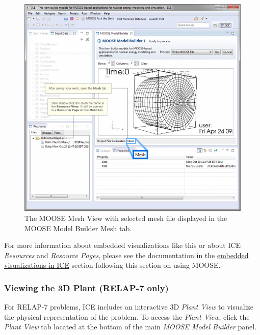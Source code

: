\begin{figure}[htbp]
\centering
\includegraphics[width=\textwidth]{figures/ICE_MOOSE_Mesh-View-2.png}
\caption{The MOOSE Mesh View with selected mesh file displayed in the MOOSE Model Builder Mesh tab. }
\end{figure}

For more information about embedded visualizations like this or about
ICE \emph{Resources} and \emph{Resource Pages}, please see the
documentation in the \href{ICE_Embedded_Visualizations}{embedded
visualizations in ICE} section following this section on using MOOSE.

\subsubsection{Viewing the 3D Plant (RELAP-7
only)}\label{viewing-the-3d-plant-relap-7-only}

For RELAP-7 problems, ICE includes an interactive 3D \emph{Plant View}
to visualize the physical representation of the problem. To access the
\emph{Plant View}, click the \emph{Plant View} tab located at the bottom
of the main \emph{MOOSE Model Builder} panel.

